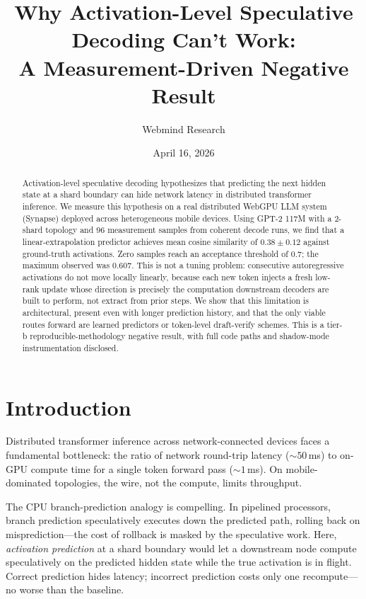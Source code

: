 \documentclass[11pt,letterpaper]{article}
\title{Why Activation-Level Speculative Decoding Can't Work:\\A Measurement-Driven Negative Result}
\author{Webmind Research}
\date{April 16, 2026}
\begin{document}
\maketitle

\begin{abstract}
Activation-level speculative decoding hypothesizes that predicting the next hidden state at a shard boundary can hide network latency in distributed transformer inference. We measure this hypothesis on a real distributed WebGPU LLM system (Synapse) deployed across heterogeneous mobile devices. Using GPT-2 117M with a 2-shard topology and 96 measurement samples from coherent decode runs, we find that a linear-extrapolation predictor achieves mean cosine similarity of $0.38 \pm 0.12$ against ground-truth activations. Zero samples reach an acceptance threshold of $0.7$; the maximum observed was $0.607$. This is not a tuning problem: consecutive autoregressive activations do not move locally linearly, because each new token injects a fresh low-rank update whose direction is precisely the computation downstream decoders are built to perform, not extract from prior steps. We show that this limitation is architectural, present even with longer prediction history, and that the only viable routes forward are learned predictors or token-level draft-verify schemes. This is a tier-b reproducible-methodology negative result, with full code paths and shadow-mode instrumentation disclosed.
\end{abstract}

\section{Introduction}

Distributed transformer inference across network-connected devices faces a fundamental bottleneck: the ratio of network round-trip latency ($\sim 50$\,ms) to on-GPU compute time for a single token forward pass ($\sim 1$\,ms). On mobile-dominated topologies, the wire, not the compute, limits throughput.

The CPU branch-prediction analogy is compelling. In pipelined processors, branch prediction speculatively executes down the predicted path, rolling back on misprediction—the cost of rollback is masked by the speculative work. Here, \emph{activation prediction} at a shard boundary would let a downstream node compute speculatively on the predicted hidden state while the true activation is in flight. Correct prediction hides latency; incorrect prediction costs only one recompute—no worse than the baseline.
\end{document}

